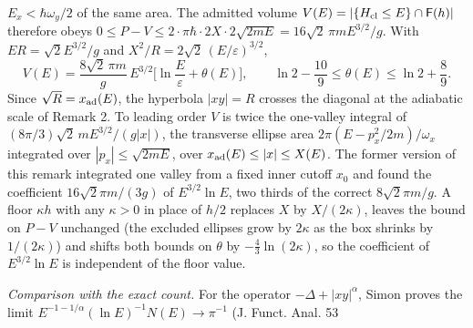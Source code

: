 \documentclass[11pt,a4paper]{article}
\begin{document}
\begin{enumerate}
  \(E_x<\hbar\omega_y/2\) of the same area. The admitted volume
  \(V(E)=|\{H_{\rm cl}\le E\}\cap\mathsf F(h)|\) therefore obeys
  \(0\le P-V\le2\cdot\pi\hbar\cdot2X\cdot2\sqrt{2mE}=16\sqrt2\,\pi mE^{3/2}/g\).
  With \(ER=\sqrt2E^{3/2}/g\) and
  \(X^2/R=2\sqrt2\,(E/\varepsilon)^{3/2}\),
  \[V(E)=\frac{8\sqrt2\,\pi m}{g}\,E^{3/2}\Big[\ln\frac E\varepsilon+\theta(E)\Big],
  \qquad\ln2-\frac{10}9\le\theta(E)\le\ln2+\frac89 .\] Since
  \(\sqrt R=x_{\rm ad}(E)\), the hyperbola \(|xy|=R\) crosses the
  diagonal at the adiabatic scale of Remark 2. To leading order \(V\) is
  twice the one-valley integral of \((8\pi/3)\sqrt2\,mE^{3/2}/(g|x|)\),
  the transverse ellipse area \(2\pi(E-p_x^2/2m)/\omega_x\) integrated
  over \(|p_x|\le\sqrt{2mE}\), over \(x_{\rm ad}(E)\le|x|\le X(E)\). The
  former version of this remark integrated one valley from a fixed inner
  cutoff \(x_0\) and found the coefficient \(16\sqrt2\pi m/(3g)\) of
  \(E^{3/2}\ln E\), two thirds of the correct \(8\sqrt2\pi m/g\). A
  floor \(\kappa h\) with any \(\kappa>0\) in place of \(h/2\) replaces
  \(X\) by \(X/(2\kappa)\), leaves the bound on \(P-V\) unchanged (the
  excluded ellipses grow by \(2\kappa\) as the box shrinks by
  \(1/(2\kappa)\)) and shifts both bounds on \(\theta\) by
  \(-\tfrac43\ln(2\kappa)\), so the coefficient of \(E^{3/2}\ln E\) is
  independent of the floor value.

  \emph{Comparison with the exact count.} For the operator
  \(-\Delta+|xy|^\alpha\), Simon proves the limit
  \(E^{-1-1/\alpha}(\ln E)^{-1}N(E)\to\pi^{-1}\) (J. Funct. Anal. 53


\end{enumerate}
\end{document}
